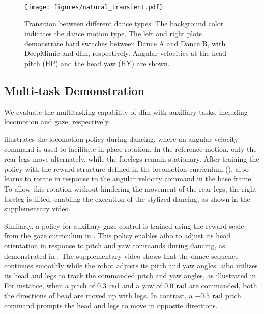 

\begin{figure}[!t]
    \centering
    \texttt{[image: figures/natural\_transient.pdf]}
    \caption{Transition between different dance types. The background color indicates the dance motion type. The left and right plots demonstrate hard switches between Dance A and Dance B, with DeepMimic and \ac{dfm}, respectively. Angular velocities at the head pitch (HP) and the head yaw (HY) are shown.}
    \label{fig:natural_transient}
    \vspace{-3ex}
\end{figure}

\subsection{Multi-task Demonstration}
We evaluate the multitasking capability of \ac{dfm} with auxiliary tasks, including locomotion and gaze, respectively.

 illustrates the locomotion policy during dancing, where an angular velocity command is used to facilitate in-place rotation.
In the reference motion, only the rear legs move alternately, while the forelegs remain stationary.
After training the policy with the reward structure defined in the locomotion curriculum (), aibo learns to rotate in response to the angular velocity command in the base frame.
To allow this rotation without hindering the movement of the rear legs, the right foreleg is lifted, enabling the execution of the stylized dancing, as shown in the supplementary video.

Similarly, a policy for auxiliary gaze control is trained using the reward scale from the gaze curriculum in .
This policy enables aibo to adjust its head orientation in response to pitch and yaw commands during dancing, as demonstrated in .
The supplementary video shows that the dance sequence continues smoothly while the robot adjusts its pitch and yaw angles.
aibo utilizes its head and legs to track the commanded pitch and yaw angles, as illustrated in .
For instance, when a pitch of $0.3$ $\rm{rad}$ and a yaw of $0.0$ $\rm{rad}$ are commanded, both the directions of head are moved up with legs.
In contrast, a $-0.5$ $\rm{rad}$ pitch command prompts the head and legs to move in opposite directions.

